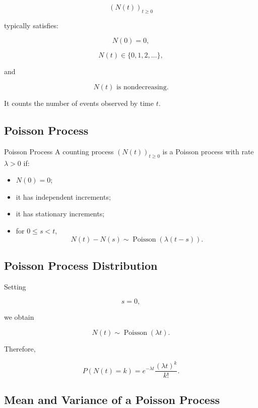 \[
(N(t))_{t\geq0}
\]

typically satisfies:

\[
\boxed{
N(0)=0,
}
\]

\[
\boxed{
N(t)\in\{0,1,2,\ldots\},
}
\]

and

\[
\boxed{
N(t)
\text{ is nondecreasing}.
}
\]

It counts the number of events observed by time \(t\).

\subsection{Poisson Process}
\label{subsec:poisson-process}

\begin{definitionbox}{Poisson Process}
A counting process \((N(t))_{t\geq0}\) is a Poisson process with rate
\(\lambda>0\) if:

\begin{itemize}
    \item \(N(0)=0\);
    \item it has independent increments;
    \item it has stationary increments;
    \item for \(0\leq s<t\),
    \[
    \boxed{
    N(t)-N(s)
    \sim
    \operatorname{Poisson}
    (
    \lambda(t-s)
    ).
    }
    \]
\end{itemize}
\end{definitionbox}

\subsection{Poisson Process Distribution}
\label{subsec:poisson-process-distribution}

Setting

\[
s=0,
\]

we obtain

\[
\boxed{
N(t)
\sim
\operatorname{Poisson}(\lambda t).
}
\]

Therefore,

\[
\boxed{
P(N(t)=k)
=
e^{-\lambda t}
\frac{
(\lambda t)^k
}{
k!
}.
}
\]

\subsection{Mean and Variance of a Poisson Process}
\label{subsec:poisson-process-mean-variance}

